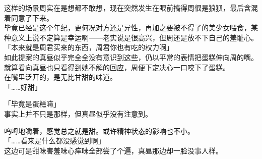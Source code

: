 这样的场景周实在是想都不敢想，现在突然发生在眼前搞得周很是狼狈，最后含混着同意了下来。\\

毕竟已经是这个年纪，更何况对方还是异性，再加之要被不得了的美少女喂食，某种意义上说不定算是幸运啊——老实说是很高兴，但周还是放不下自己的羞耻心。\\

「本来就是周君买来的东西，周君你也有吃的权力啊」\\

如此提案的真昼似乎完全全没有意识到这些，仍以平常的表情把蛋糕伸向周的嘴。\\

就算看向真昼也只看得到她不解的回应，周便下定决心一口咬下了蛋糕。\\

在嘴里泛开的，是无比甘甜的味道。\\

「……好甜」

「毕竟是蛋糕嘛」\\

事实上并不只是那样，但真昼似乎没有注意到。

呜呣地嚼着，感觉总之就是甜。或许精神状态的影响也不小。\\

「……看来是什么都没感觉到啊」\\

这边可是甜味害羞味心痒味全部尝了个遍，真昼那边却一脸没事人样。\\

